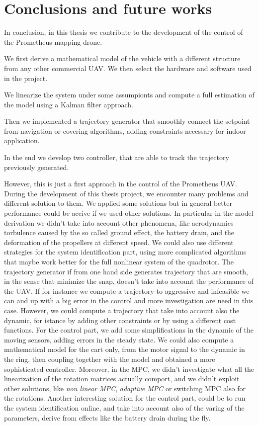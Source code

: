 \chapter{Conclusions and future works}
\label{conclusions}

In conclusion, in this thesis we contribute to the development of the control of the Prometheus mapping drone. 

\noindent We first derive a mathematical model of the vehicle with a different structure from any other commercial UAV. We then select the hardware and software used in the project. 

\noindent We linearize the system under some assumpionts and compute a full estimation of the model using a Kalman filter approach.

\noindent Then we implemented a trajectory generator that smoothly connect the setpoint from navigation or covering algorithms, adding constraints necessary for indoor application.

\noindent In the end we develop two controller, that are able to track the trajectory previously generated.

\noindent However, this is just a first approach in the control of the Prometheus UAV. During the development of this thesis project, we encounter many problems and different solution to them. We applied some solutions but in general better performance could be accive if we used other solutions. In particular in the model derivation we didn't take into account other phenomena, like aerodynamics torbulence caused by the so called ground effect, the battery drain, and the deformation of the propellers at different speed. We could also use different strategies for the system identification part, using more complicated algorithms that maybe work better for the full nonlinear system of the quadrotor. The trajectory generator if from one hand side generates trajectory that are smooth, in the sense that minimize the snap, doesn't take into account the performance of the UAV. If for instance we compute a trajectory to aggressive and infeasible we can and up with a big error in the control and more investigation are need in this case. However, we could compute a trajectory that take into account also the dynamic, for istance by adding other constraints or by using a different cost functions. For the control part,  we add some simplifications in the dynamic of the moving sensors, adding errors in the steady state. We could also compute a mathematical model for the cart only, from the motor signal to the dynamic in the ring, then coupling together with the model and obtained a more sophisticated controller. Moreover, in the MPC, we didn't investigate what all the linearization of the rotation matrices actually comport, and we didn't exploit other solutions, like \textit{non linear MPC}, \textit{adaptive MPC} or switching MPC also for the rotations. Another interesting solution for the control part, could be to run the system identification online, and take into account also of the varing of the parameters, derive from effects like the battery drain during the fly.